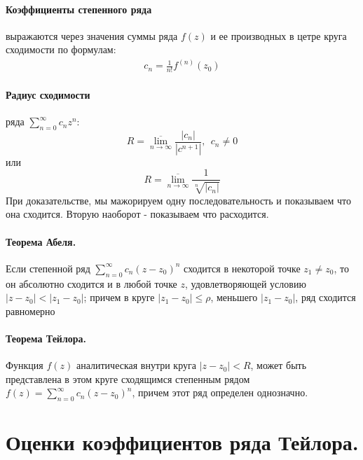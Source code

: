 \documentclass[12pt]{extarticle}
\begin{document}
\paragraph{Коэффициенты степенного ряда}
выражаются через значения суммы ряда $f(z)$ и ее производных в цетре
круга сходимости по формулам:
\begin{eqnarray*}
    c_{n}=\frac{1}{n!}f^{(n)}(z_{0})
\end{eqnarray*}

\paragraph{Радиус сходимости}
 ряда $\sum\limits_{n=0}^{\infty}c_{n}z^{n}$:
\begin{displaymath}
    R=\overline{\lim\limits_{n\rightarrow
    \infty}}\frac{|c_{n}|}{\left|c^{n+1}\right|},\ \ c_{n}\neq 0
\end{displaymath}
или
\begin{displaymath}
    R=\overline{\lim\limits_{n\rightarrow \infty}}\frac{1}{\sqrt[n]{\left|c_{n}\right|}}
\end{displaymath}
При доказательстве, мы мажорируем одну последовательность и показываем
что она сходится. Вторую наоборот - показываем что расходится.

\paragraph{Теорема Абеля.} Если степенной ряд
$\sum\limits_{n=0}^{\infty}c_{n}(z-z_{0})^{n}$ сходится в некоторой
точке $z_{1}\neq z_{0}$, то он абсолютно сходится и в любой точке $z$,
удовлетворяющей условию $|z-z_{0}|<|z_{1}-z_{0}|$; причем в круге
$|z_{1}-z_{0}|\leqslant\rho$, меньшего $|z_{1}-z_{0}|$, ряд сходится
равномерно

\paragraph{Теорема Тейлора.} Функция $f(z)$
аналитическая внутри круга $|z-z_{0}|<R$, может быть представлена в этом
круге сходящимся степенным рядом
$f(z)=\sum\limits_{n=0}^{\infty}c_{n}(z-z_{0})^{n}$, причем этот ряд
определен однозначно.


\section{Оценки коэффициентов ряда Тейлора.}
\end{document}
